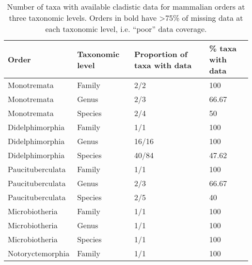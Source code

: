 

\begin{longtable}{llll}
\caption{Number of taxa with available cladistic data for mammalian orders at three taxonomic levels. Orders in bold have \textgreater 75\% of missing data at each taxonomic level, i.e. ``poor'' data coverage. 
} \\ 
  \hline
Order & Taxonomic level & Proportion of taxa with data & \% taxa with data \\ 
  \hline
Monotremata & Family & 2/2 & 100 \\ 
  Monotremata & Genus & 2/3 & 66.67 \\ 
  Monotremata & Species & 2/4 & 50 \\ 
  Didelphimorphia & Family & 1/1 & 100 \\ 
  Didelphimorphia & Genus & 16/16 & 100 \\ 
  Didelphimorphia & Species & 40/84 & 47.62 \\ 
  Paucituberculata & Family & 1/1 & 100 \\ 
  Paucituberculata & Genus & 2/3 & 66.67 \\ 
  Paucituberculata & Species & 2/5 & 40 \\ 
  Microbiotheria & Family & 1/1 & 100 \\ 
  Microbiotheria & Genus & 1/1 & 100 \\ 
  Microbiotheria & Species & 1/1 & 100 \\ 
  Notoryctemorphia & Family & 1/1 & 100 \\ 

\end{longtable}
